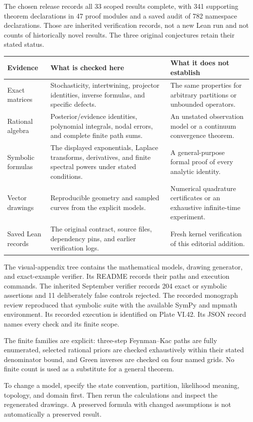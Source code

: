 The chosen release records all 33 scoped results complete, with 341 supporting theorem declarations in 47 proof modules and a saved audit of 782 namespace declarations. Those are inherited verification records, not a new Lean run and not counts of historically novel results. The three original conjectures retain their stated status.
\begin{tabularx}{\linewidth}{@{}>{\raggedright\arraybackslash}p{1.22in}YY@{}}
\toprule
Evidence & What is checked here & What it does not establish\\
\midrule
Exact matrices & Stochasticity, intertwining, projector identities, inverse formulas, and specific defects. & The same properties for arbitrary partitions or unbounded operators.\\
Rational algebra & Posterior/evidence identities, polynomial integrals, nodal errors, and complete finite path sums. & An unstated observation model or a continuum convergence theorem.\\
Symbolic formulas & The displayed exponentials, Laplace transforms, derivatives, and finite spectral powers under stated conditions. & A general-purpose formal proof of every analytic identity.\\
Vector drawings & Reproducible geometry and sampled curves from the explicit models. & Numerical quadrature certificates or an exhaustive infinite-time experiment.\\
Saved Lean records & The original contract, source files, dependency pins, and earlier verification logs. & Fresh kernel verification of this editorial addition.\\
\bottomrule
\end{tabularx}
The visual-appendix tree contains the mathematical models, drawing generator, and exact-example verifier. Its README records their paths and execution commands. The inherited September verifier records 204 exact or symbolic assertions and 11 deliberately false controls rejected. The recorded monograph review reproduced that symbolic suite with the available SymPy and mpmath environment. Its recorded execution is identified on Plate VI.42. Its JSON record names every check and its finite scope.

The finite families are explicit: three-step Feynman--Kac paths are fully enumerated, selected rational priors are checked exhaustively within their stated denominator bound, and Green inverses are checked on four named grids. No finite count is used as a substitute for a general theorem.

To change a model, specify the state convention, partition, likelihood meaning, topology, and domain first. Then rerun the calculations and inspect the regenerated drawings. A preserved formula with changed assumptions is not automatically a preserved result.
